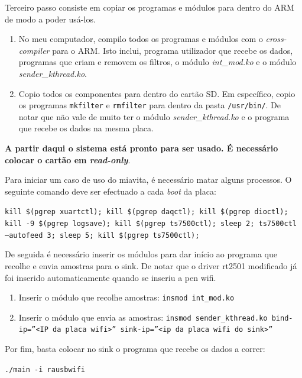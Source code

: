 \documentclass[10pt,a4paper,oneside]{book}
\begin{document}
	Terceiro passo consiste em copiar os programas e módulos para dentro do ARM de modo a poder usá-los.

	\begin{enumerate}
		\item No meu computador, compilo todos os programas e módulos com o \emph{cross-compiler} para o ARM. Isto inclui, programa utilizador que recebe os dados, programas que criam e removem os filtros, o módulo \emph{int\_mod.ko} e o módulo \emph{sender\_kthread.ko}.
		\item Copio todos os componentes para dentro do cartão SD. Em específico, copio os programas {\tt mkfilter} e {\tt rmfilter} para dentro da pasta {\tt /usr/bin/}. De notar que não vale de muito ter o módulo \emph{sender\_kthread.ko} e o programa que recebe os dados na mesma placa.
	\end{enumerate}
	
	\textbf{A partir daqui o sistema está pronto para ser usado. É necessário colocar o cartão em \emph{read-only}}.
	
	Para iniciar um caso de uso do miavita, é necessário matar alguns processos. O seguinte comando deve ser efectuado a cada \emph{boot} da placa:
	
	\begin{center}
		{\tt kill \$(pgrep xuartctl); kill \$(pgrep daqctl);  kill \$(pgrep dioctl); kill -9 \$(pgrep logsave); kill \$(pgrep ts7500ctl); sleep 2; ts7500ctl --autofeed 3; sleep 5; kill \$(pgrep ts7500ctl);}
	\end{center}
	
	De seguida é necessário inserir os módulos para dar início ao programa que recolhe e envia amostras para o sink. De notar que o driver rt2501 modificado já foi inserido automaticamente quando se inseriu a pen wifi.
	
	\begin{enumerate}
		\item Inserir o módulo que recolhe amostras: {\tt insmod int\_mod.ko}
		\item Inserir o módulo que envia as amostras: {\tt insmod  sender\_kthread.ko bind-ip=''<IP da placa wifi>''  sink-ip=''<ip da placa wifi do sink>''}
	\end{enumerate}
	
	Por fim, basta colocar no sink o programa que recebe os dados a correr:
	
	\begin{center}
		{\tt ./main -i rausbwifi}
	\end{center}
	
\end{document}
